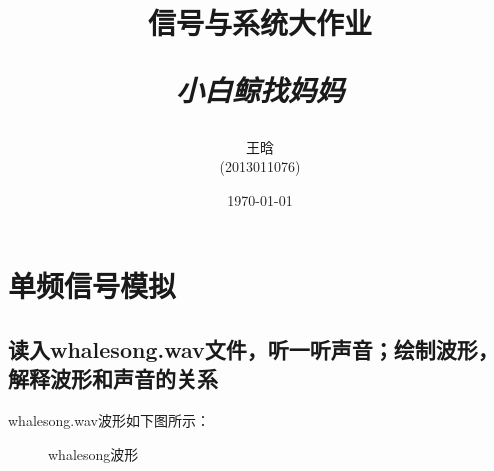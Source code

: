 \documentclass{article}
\begin{document}
	\title{\textbf{信号与系统大作业} \\ [2ex] \begin{large} \emph{小白鲸找妈妈} \end{large} }
	\author{王晗\\(2013011076)}
	\date{\today}
	\maketitle
	\section{单频信号模拟}
		\subsection{读入whalesong.wav文件，听一听声音；绘制波形，解释波形和声音的关系}
            whalesong.wav波形如下图所示：
            \begin{figure}[htb]
                \centering
                \hspace{10pt}
                \caption{whalesong波形}
                \label{fig:origin}
            \end{figure}
            
\end{document}
